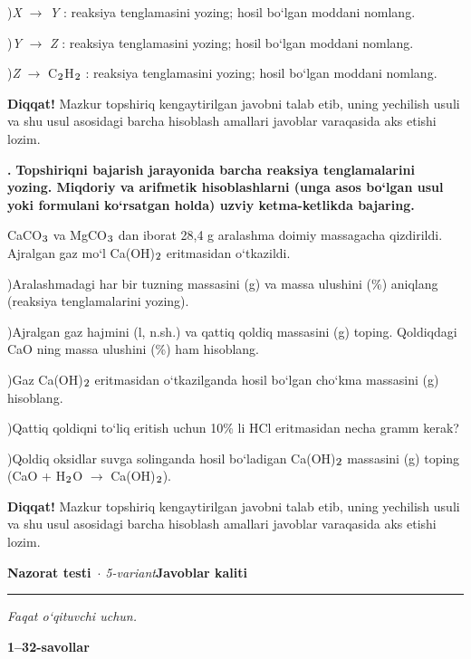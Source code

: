 \documentclass[11pt,a4paper]{article}
\renewcommand{\textsubscript}[1]{\ensuremath{_{\text{\fontsize{8}{8}\selectfont #1}}}}
\newcommand{\qn}[1]{\textbf{\fontsize{11.5}{13}\selectfont #1}}
\newcommand{\qsep}{\par\vspace{1pt}\noindent\rule{0pt}{0.4pt}\par\vspace{5pt}}
\newcommand{\diqqat}[1]{\par\smallskip\noindent\textbf{Diqqat!} #1\par\medskip}
\begin{document}
)\textit{X} $\to$ \textit{Y} : reaksiya tenglamasini yozing; hosil bo`lgan moddani nomlang.\par
{})\textit{Y} $\to$ \textit{Z} : reaksiya tenglamasini yozing; hosil bo`lgan moddani nomlang.\par
{})\textit{Z} $\to$ C\textsubscript{2}H\textsubscript{2} : reaksiya tenglamasini yozing; hosil bo`lgan moddani nomlang.\par
\diqqat{Mazkur topshiriq kengaytirilgan javobni talab etib, uning yechilish usuli va shu usul asosidagi barcha hisoblash amallari javoblar varaqasida aks etishi lozim.}\qsep
\noindent\qn{43.} \textbf{Topshiriqni bajarish jarayonida barcha reaksiya tenglamalarini yozing. Miqdoriy va arifmetik hisoblashlarni (unga asos bo`lgan usul yoki formulani ko`rsatgan holda) uzviy ketma-ketlikda bajaring.}\par\smallskip
CaCO\textsubscript{3} va MgCO\textsubscript{3} dan iborat 28,4 g aralashma doimiy massagacha qizdirildi. Ajralgan gaz mo`l Ca(OH)\textsubscript{2} eritmasidan o`tkazildi.\par
{})Aralashmadagi har bir tuzning massasini (g) va massa ulushini (\%) aniqlang (reaksiya tenglamalarini yozing).\par
{})Ajralgan gaz hajmini (l, n.sh.) va qattiq qoldiq massasini (g) toping. Qoldiqdagi CaO ning massa ulushini (\%) ham hisoblang.\par
{})Gaz Ca(OH)\textsubscript{2} eritmasidan o`tkazilganda hosil bo`lgan cho`kma massasini (g) hisoblang.\par
{})Qattiq qoldiqni to`liq eritish uchun 10\% li HCl eritmasidan necha gramm kerak?\par
{})Qoldiq oksidlar suvga solinganda hosil bo`ladigan Ca(OH)\textsubscript{2} massasini (g) toping (CaO + H\textsubscript{2}O $\to$ Ca(OH)\textsubscript{2}).\par
\diqqat{Mazkur topshiriq kengaytirilgan javobni talab etib, uning yechilish usuli va shu usul asosidagi barcha hisoblash amallari javoblar varaqasida aks etishi lozim.}\qsep
\newpage
\noindent\textbf{\fontsize{13}{15}\selectfont Nazorat testi}\ \textit{$\cdot$ 5-variant}\hfill \textbf{Javoblar kaliti}\par\smallskip\hrule\smallskip
\textit{Faqat o`qituvchi uchun.}\par\medskip
\noindent\textbf{1--32-savollar}\par\smallskip
\end{document}
